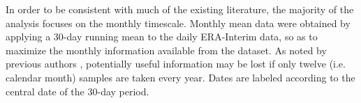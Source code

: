 In order to be consistent with much of the existing literature, the majority of the analysis focuses on the monthly timescale. Monthly mean data were obtained by applying a 30-day running mean to the daily ERA-Interim data, so as to maximize the monthly information available from the dataset. As noted by previous authors \citep[e.g.][]{Kidson1988}, potentially useful information may be lost if only twelve (i.e. calendar month) samples are taken every year. Dates are labeled according to the central date of the 30-day period.   